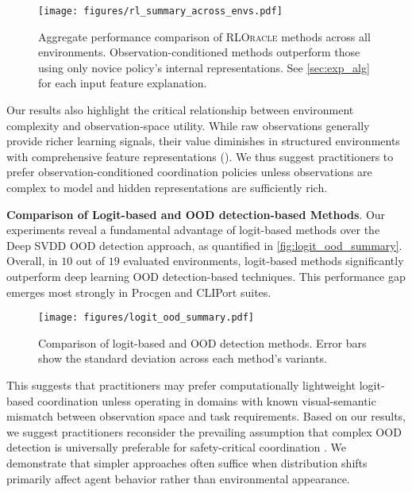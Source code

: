 \begin{figure}[t]
    \centering
    \texttt{[image: figures/rl\_summary\_across\_envs.pdf]}
    \caption{Aggregate performance comparison of \textsc{RLOracle} methods across all environments. Observation-conditioned methods outperform those using only novice policy's internal representations. See \autoref{sec:exp_alg} for each input feature explanation.}
    \label{fig:rl_summary}
\end{figure}

Our results also highlight the critical relationship between environment complexity and observation-space utility. While raw observations generally provide richer learning signals, their value diminishes in structured environments with comprehensive feature representations (). 
We thus suggest practitioners to prefer observation-conditioned coordination policies unless observations are complex to model and hidden representations are sufficiently rich.


\textbf{Comparison of Logit-based and OOD detection-based Methods}.
Our experiments reveal a fundamental advantage of logit-based methods over the Deep SVDD OOD detection approach, as quantified in \autoref{fig:logit_ood_summary}. Overall, in $10$ out of $19$ evaluated environments, logit-based methods  significantly outperform deep learning OOD detection-based techniques. This performance gap emerges most strongly in Procgen and CLIPort suites.

\begin{figure}[t]
    \centering
    \texttt{[image: figures/logit\_ood\_summary.pdf]}
    \caption{Comparison of \colorbox{boxred}{logit-based } and \colorbox{boxpurple}{OOD detection} methods. Error bars show the standard deviation across each method's variants.}
    \label{fig:logit_ood_summary}
\end{figure}


This suggests that practitioners may prefer computationally lightweight logit-based coordination unless operating in domains with known visual-semantic mismatch between observation space and task requirements.
Based on our results, we suggest practitioners reconsider the prevailing assumption that complex OOD detection is universally preferable for safety-critical coordination \citep{yang2024generalized}. We demonstrate that simpler approaches often suffice when distribution shifts primarily affect agent behavior rather than environmental appearance.




